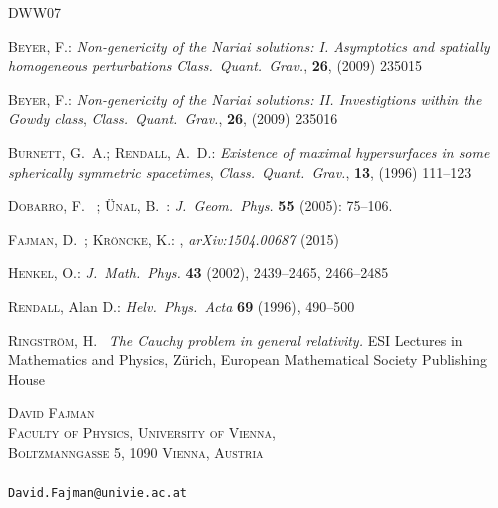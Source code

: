 \documentclass[a4paper,10pt]{article}
\theoremstyle{plain}
\theoremstyle{definition}
\theoremstyle{remark}
\theoremstyle{plain}
\numberwithin{equation}{section}
\begin{document}
\begin{thebibliography}{DWW07}

\textsc{Beyer}, F.:
\newblock \emph{{Non-genericity of the Nariai solutions: I. Asymptotics and spatially homogeneous perturbations}}
\newblock \emph{Class.~Quant.~Grav.}, \textbf{26}, (2009) 235015

\textsc{Beyer}, F.:
\newblock \emph{{Non-genericity of the Nariai solutions: II. Investigtions within the Gowdy class}},
\newblock \emph{Class.~Quant.~Grav.}, \textbf{26}, (2009) 235016

\textsc{Burnett}, G.~A.; \textsc{Rendall}, A.~D.:
\newblock \emph{{Existence of maximal hypersurfaces in some spherically symmetric spacetimes}},
\newblock \emph{Class.~Quant.~Grav.}, \textbf{13}, (1996) 111--123


\textsc{Dobarro}, F.~ ;  \textsc{\"Unal}, B.~: 
\newblock \emph{J.~Geom.~Phys.} \textbf{55} (2005): 75--106.

\textsc{Fajman}, D.~; \textsc{Kr\"oncke}, K.:
,
\newblock \emph{arXiv:1504.00687} (2015)



\textsc{Henkel}, O.:
\emph{J.~Math.~Phys.} \textbf{43} (2002), 2439--2465, 2466--2485

\textsc{Rendall}, Alan D.:
\emph{Helv.~Phys.~Acta} \textbf{69} (1996), 490--500






\textsc{Ringström}, H.~
\newblock \emph{The Cauchy problem in general relativity.}
\newblock ESI Lectures in Mathematics and Physics, Zürich, European Mathematical Society Publishing House



\end{thebibliography}
\vspace{0.1cm}
\noindent
\textsc{David Fajman\\
Faculty of Physics, University of Vienna,\\
Boltzmanngasse 5, 1090 Vienna, Austria}\\ 
\vspace{-0.4cm}\\
\texttt{David.Fajman@univie.ac.at}\\
\end{document}
